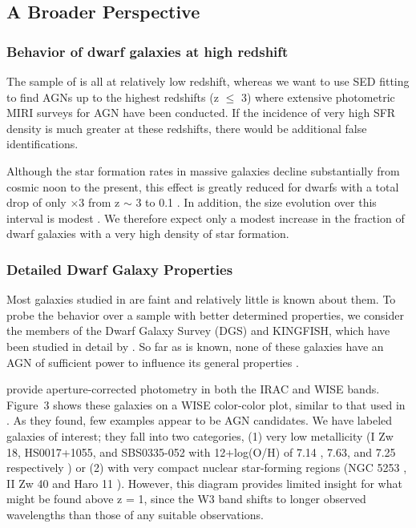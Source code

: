 \documentclass[twocolumn]{aastex63}
\begin{document}
{\subsection{A Broader Perspective}

\subsubsection{Behavior of dwarf galaxies at high redshift}

The sample of \citet{Hainline2016} is all at relatively low redshift, whereas we want to use SED fitting to find AGNs up to the highest redshifts (z $\le$ 3) where extensive photometric MIRI surveys for AGN have been conducted. If the incidence of very high SFR density is much greater at these redshifts, there would be additional false identifications. 

Although the star formation rates in massive galaxies decline substantially from cosmic noon to the present, this effect is greatly reduced for dwarfs with a total drop of only $ \times 3$ from z $\sim$ 3 to 0.1 \citep[][Figure 4]{Forster2020}. In addition, the size evolution over this interval is modest \citep[e.g.,][]{Mowla2019, Euclid2025}. We therefore expect only a modest increase in the fraction of dwarf galaxies with a very high density of star formation. 

\subsubsection{Detailed Dwarf 
Galaxy Properties}

Most galaxies studied in \citet{Hainline2016} are faint and relatively
little is known about them. To probe the behavior over a sample with better  determined properties,  we consider the members of the Dwarf Galaxy
Survey (DGS) and KINGFISH, which have been studied in detail by \citet{Remy2013,
Remy2015}.   So
far as is known, none of these galaxies have an AGN of  sufficient power to influence its general properties
\citep{Remy2015}.

\citet{Remy2015} provide aperture-corrected photometry in both the IRAC and WISE bands. Figure~3 shows these galaxies on a WISE color-color plot, similar to that used
in \citet{Hainline2016}. As they found, few examples appear to be AGN
candidates. We have labeled galaxies of interest; they fall into two categories,
(1) very low metallicity (I Zw 18, HS0017+1055, and SBS0335-052 with 12+log(O/H)
of 7.14 , 7.63, and 7.25 respectively \citep{Remy2013}) or (2) with very compact
nuclear star-forming regions (NGC 5253 \citep{Smith2020}, II Zw 40 \citep{Kepley2014} and Haro 11
\citep{Derossi2018}). However, this diagram provides limited insight for what might be found above z = 1, since the W3 band shifts to longer observed wavelengths than
those of any suitable observations.

}
\end{document}
